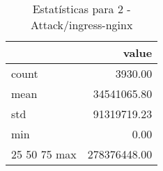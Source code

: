 \begin{table}[htbp]
\caption{Estatísticas para 2 - Attack/ingress-nginx}
\label{tab:2_-_attack_ingress-nginx_summary}
\begin{tabular}{lr}
\toprule
 & value \\
\midrule
count & 3930.00 \\
mean & 34541065.80 \\
std & 91319719.23 \\
min & 0.00 \\
25%
50%
75%
max & 278376448.00 \\
\bottomrule
\end{tabular}
\end{table}
